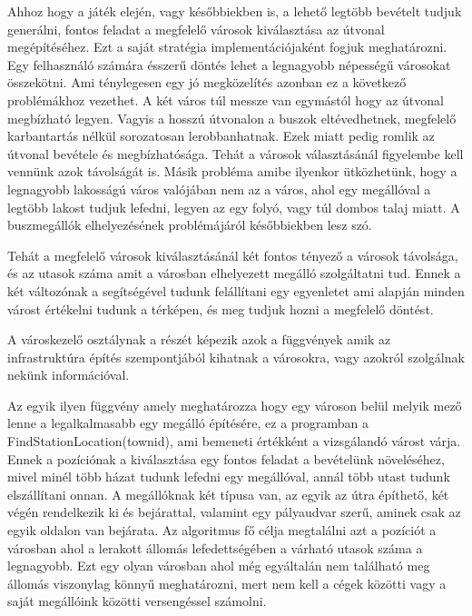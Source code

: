 
Ahhoz hogy a játék elején, vagy későbbiekben is, a lehető legtöbb bevételt tudjuk generálni, fontos feladat a megfelelő városok kiválasztása az útvonal megépítéséhez. Ezt a saját stratégia implementációjaként fogjuk meghatározni. Egy felhasználó számára ésszerű döntés lehet a legnagyobb népességű városokat összekötni. Ami ténylegesen egy jó megközelítés azonban ez a következő problémákhoz vezethet. A két város túl messze van egymástól hogy az útvonal megbízható legyen. Vagyis a hosszú útvonalon a buszok eltévedhetnek, megfelelő karbantartás nélkül sorozatosan lerobbanhatnak. Ezek miatt pedig romlik az útvonal bevétele és megbízhatósága. Tehát a városok választásánál figyelembe kell vennünk azok távolságát is. Másik probléma amibe ilyenkor ütközhetünk, hogy a legnagyobb lakosságú város valójában nem az a város, ahol egy megállóval a legtöbb lakost tudjuk lefedni, legyen az egy folyó, vagy túl dombos talaj miatt. A buszmegállók elhelyezésének problémájáról későbbiekben lesz szó.

Tehát a megfelelő városok kiválasztásánál két fontos tényező a városok távolsága, és az utasok száma amit a városban elhelyezett megálló szolgáltatni tud. Ennek a két változónak a segítségével tudunk felállítani egy egyenletet ami alapján minden várost értékelni tudunk a térképen, és meg tudjuk hozni a megfelelő döntést.


A városkezelő osztálynak a részét képezik azok a függvények amik az infrastruktúra építés szempontjából kihatnak a városokra, vagy azokról szolgálnak nekünk információval.

Az egyik ilyen függvény amely meghatározza hogy egy városon belül melyik mező lenne a legalkalmasabb egy megálló építésére, ez a programban a FindStationLocation(townid), ami bemeneti értékként a vizsgálandó várost várja. Ennek a pozíciónak a kiválasztása egy fontos feladat a bevételünk növeléséhez, mivel minél több házat tudunk lefedni egy megállóval, annál több utast tudunk elszállítani onnan. A megállóknak két típusa van, az egyik az útra építhető, két végén rendelkezik ki és bejárattal, valamint egy pályaudvar szerű, aminek csak az egyik oldalon van bejárata. Az algoritmus fő célja megtalálni azt a pozíciót a városban ahol a lerakott állomás lefedettségében a várható utasok száma a legnagyobb. Ezt egy olyan városban ahol még egyáltalán nem található meg állomás viszonylag könnyű meghatározni, mert nem kell a cégek közötti vagy a saját megállóink közötti versengéssel számolni.

